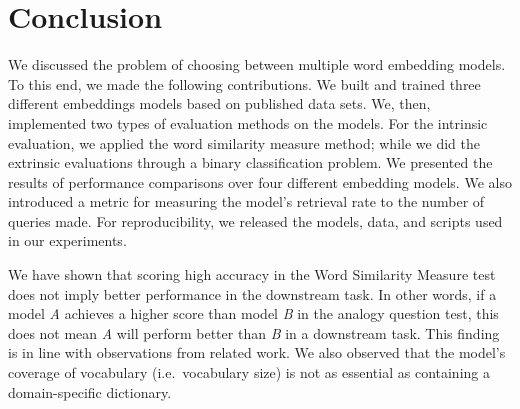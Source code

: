 \documentclass[11pt,letterpaper]{article}
\begin{document}
\section{Conclusion}\label{conclusion}

We discussed the problem of choosing between multiple word embedding
models. To this end, we made the following contributions. We built and
trained three different embeddings models based on published data sets.
We, then, implemented two types of evaluation methods on the models. For
the intrinsic evaluation, we applied the word similarity measure method;
while we did the extrinsic evaluations through a binary classification
problem. We presented the results of performance comparisons over four
different embedding models. We also introduced a metric for measuring
the model's retrieval rate to the number of queries made. For
reproducibility, we released the models, data, and scripts used in our
experiments.

We have shown that scoring high accuracy in the Word Similarity Measure
test does not imply better performance in the downstream task. In other
words, if a model \emph{A} achieves a higher score than model \emph{B}
in the analogy question test, this does not mean \emph{A} will perform
better than \emph{B} in a downstream task. This finding is in line with
observations from related work. We also observed that the model's
coverage of vocabulary (i.e.~vocabulary size) is not as essential as
containing a domain-specific dictionary.


\end{document}
